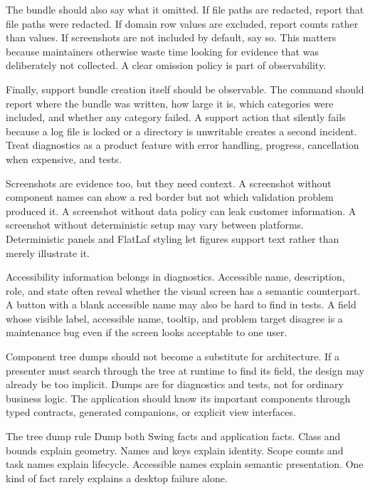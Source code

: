 The bundle should also say what it omitted. If file paths are redacted, report that file paths were redacted. If domain row values are excluded, report counts rather than values. If screenshots are not included by default, say so. This matters because maintainers otherwise waste time looking for evidence that was deliberately not collected. A clear omission policy is part of observability.

Finally, support bundle creation itself should be observable. The command should report where the bundle was written, how large it is, which categories were included, and whether any category failed. A support action that silently fails because a log file is locked or a directory is unwritable creates a second incident. Treat diagnostics as a product feature with error handling, progress, cancellation when expensive, and tests.

Screenshots are evidence too, but they need context. A screenshot without component names can show a red border but not which validation problem produced it. A screenshot without data policy can leak customer information. A screenshot without deterministic setup may vary between platforms. Deterministic panels and FlatLaf styling let figures support text rather than merely illustrate it.

Accessibility information belongs in diagnostics. Accessible name, description, role, and state often reveal whether the visual screen has a semantic counterpart. A button with a blank accessible name may also be hard to find in tests. A field whose visible label, accessible name, tooltip, and problem target disagree is a maintenance bug even if the screen looks acceptable to one user.

Component tree dumps should not become a substitute for architecture. If a presenter must search through the tree at runtime to find its field, the design may already be too implicit. Dumps are for diagnostics and tests, not for ordinary business logic. The application should know its important components through typed contracts, generated companions, or explicit view interfaces.

\begin{detailbox}{The tree dump rule}
Dump both Swing facts and application facts. Class and bounds explain geometry. Names and keys explain identity. Scope counts and task names explain lifecycle. Accessible names explain semantic presentation. One kind of fact rarely explains a desktop failure alone.
\end{detailbox}

